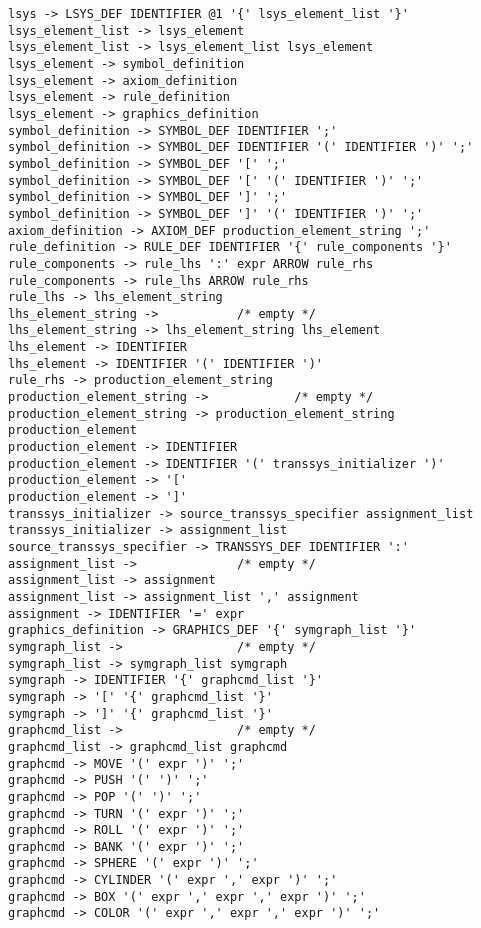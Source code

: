 \documentclass[12pt]{article}
\begin{document}
\begin{footnotesize}
\begin{verbatim}
lsys -> LSYS_DEF IDENTIFIER @1 '{' lsys_element_list '}'
lsys_element_list -> lsys_element
lsys_element_list -> lsys_element_list lsys_element
lsys_element -> symbol_definition
lsys_element -> axiom_definition
lsys_element -> rule_definition
lsys_element -> graphics_definition
symbol_definition -> SYMBOL_DEF IDENTIFIER ';'
symbol_definition -> SYMBOL_DEF IDENTIFIER '(' IDENTIFIER ')' ';'
symbol_definition -> SYMBOL_DEF '[' ';'
symbol_definition -> SYMBOL_DEF '[' '(' IDENTIFIER ')' ';'
symbol_definition -> SYMBOL_DEF ']' ';'
symbol_definition -> SYMBOL_DEF ']' '(' IDENTIFIER ')' ';'
axiom_definition -> AXIOM_DEF production_element_string ';'
rule_definition -> RULE_DEF IDENTIFIER '{' rule_components '}'
rule_components -> rule_lhs ':' expr ARROW rule_rhs
rule_components -> rule_lhs ARROW rule_rhs
rule_lhs -> lhs_element_string
lhs_element_string ->           /* empty */
lhs_element_string -> lhs_element_string lhs_element
lhs_element -> IDENTIFIER
lhs_element -> IDENTIFIER '(' IDENTIFIER ')'
rule_rhs -> production_element_string
production_element_string ->            /* empty */
production_element_string -> production_element_string production_element
production_element -> IDENTIFIER
production_element -> IDENTIFIER '(' transsys_initializer ')'
production_element -> '['
production_element -> ']'
transsys_initializer -> source_transsys_specifier assignment_list
transsys_initializer -> assignment_list
source_transsys_specifier -> TRANSSYS_DEF IDENTIFIER ':'
assignment_list ->              /* empty */
assignment_list -> assignment
assignment_list -> assignment_list ',' assignment
assignment -> IDENTIFIER '=' expr
graphics_definition -> GRAPHICS_DEF '{' symgraph_list '}'
symgraph_list ->                /* empty */
symgraph_list -> symgraph_list symgraph
symgraph -> IDENTIFIER '{' graphcmd_list '}'
symgraph -> '[' '{' graphcmd_list '}'
symgraph -> ']' '{' graphcmd_list '}'
graphcmd_list ->                /* empty */
graphcmd_list -> graphcmd_list graphcmd
graphcmd -> MOVE '(' expr ')' ';'
graphcmd -> PUSH '(' ')' ';'
graphcmd -> POP '(' ')' ';'
graphcmd -> TURN '(' expr ')' ';'
graphcmd -> ROLL '(' expr ')' ';'
graphcmd -> BANK '(' expr ')' ';'
graphcmd -> SPHERE '(' expr ')' ';'
graphcmd -> CYLINDER '(' expr ',' expr ')' ';'
graphcmd -> BOX '(' expr ',' expr ',' expr ')' ';'
graphcmd -> COLOR '(' expr ',' expr ',' expr ')' ';'
\end{verbatim}
\end{footnotesize}
\end{document}
